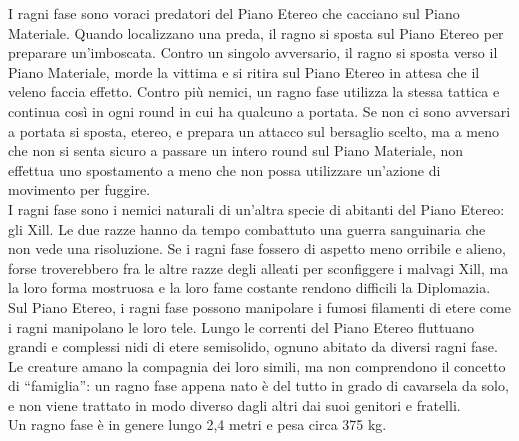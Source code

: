 \begin{multicols}{2}
I ragni fase sono voraci predatori del Piano Etereo che cacciano sul Piano Materiale. Quando localizzano una preda, il ragno si sposta sul Piano Etereo per preparare un’imboscata. Contro un singolo avversario, il ragno si sposta verso il Piano Materiale, morde la vittima e si ritira sul Piano Etereo in attesa che il veleno faccia effetto. Contro più nemici, un ragno fase utilizza la stessa tattica e continua così in ogni round in cui ha qualcuno a portata. Se non ci sono avversari a portata si sposta, etereo, e prepara un attacco sul bersaglio scelto, ma a meno che non si senta sicuro a passare un intero round sul Piano Materiale, non effettua uno spostamento a meno che non possa utilizzare un’azione di movimento per fuggire.\\

I ragni fase sono i nemici naturali di un'altra specie di abitanti del Piano Etereo: gli Xill. Le due razze hanno da tempo combattuto una guerra sanguinaria che non vede una risoluzione. Se i ragni fase fossero di aspetto meno orribile e alieno, forse troverebbero fra le altre razze degli alleati per sconfiggere i malvagi Xill, ma la loro forma mostruosa e la loro fame costante rendono difficili la Diplomazia.\\

Sul Piano Etereo, i ragni fase possono manipolare i fumosi filamenti di etere come i ragni manipolano le loro tele. Lungo le correnti del Piano Etereo fluttuano grandi e complessi nidi di etere semisolido, ognuno abitato da diversi ragni fase. Le creature amano la compagnia dei loro simili, ma non comprendono il concetto di “famiglia”: un ragno fase appena nato è del tutto in grado di cavarsela da solo, e non viene trattato in modo diverso dagli altri dai suoi genitori e fratelli.\\

Un ragno fase è in genere lungo 2,4 metri e pesa circa 375 kg. \\


\end{multicols}
